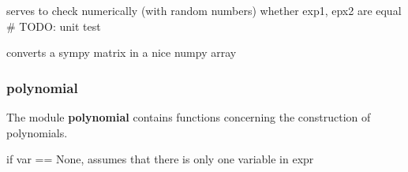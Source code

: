 \documentclass[letterpaper,10pt,english]{sphinxmanual}
\begin{document}

\begin{fulllineitems}
\label{pycontroltools:auxfuncs.math.numtools.np_trunc_small_values}
\end{fulllineitems}


\begin{fulllineitems}
\label{pycontroltools:auxfuncs.math.numtools.random_equaltest}
serves to check numerically (with random numbers) whether exp1, epx2 are equal
\# TODO: unit test

\end{fulllineitems}


\begin{fulllineitems}
\label{pycontroltools:auxfuncs.math.numtools.to_np}
converts a sympy matrix in a nice numpy array

\end{fulllineitems}



\subsubsection{\textbf{polynomial}}
\label{pycontroltools:polynomial}
The module \textbf{polynomial} contains functions concerning the construction
of polynomials.
\label{pycontroltools:module-auxfuncs.math.polynomial}\label{pycontroltools:module-polynomial}

\begin{fulllineitems}
\label{pycontroltools:auxfuncs.math.polynomial.coeffs}
if var == None, assumes that there is only one variable in expr

\end{fulllineitems}
\end{document}
